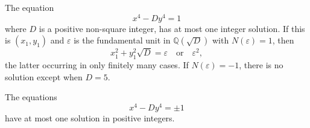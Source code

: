 \begin{proposition}
    The equation
\[
    x^4-Dy^4=1
\]
    where $D$ is a positive non-square integer, has at most one integer solution. If this is $(x_1,y_1)$ and $\varepsilon$ is the fundamental unit in $\mathbb{Q}(\sqrt{D})$ with $N(\varepsilon)=1$, then
\[
    x_1^2+y_1^2\sqrt{D}=\varepsilon\quad\text{or}\quad\varepsilon^2,
\]
    the latter occurring in only finitely many cases. If $N(\varepsilon)=-1$, there is no solution except when $D=5$.
\end{proposition}

\begin{proposition}
    The equations
\[
    x^4-Dy^4=\pm1
\]
    have at most one solution in positive integers.
\end{proposition}
